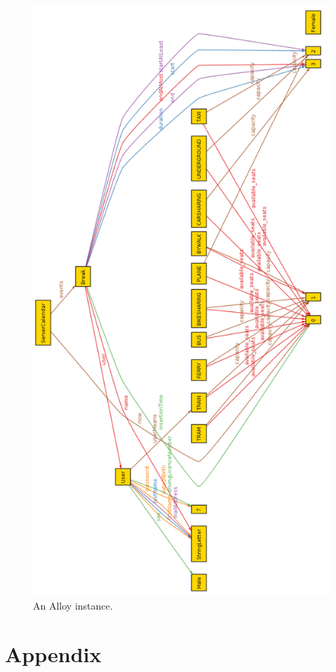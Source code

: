 \documentclass{article}
\begin{document}
	\begin{figure}[h!]
		\bigskip
		\centering
		\includegraphics[scale=0.4]{img/diagrams/i.png}
		\caption{An Alloy instance.}
	\end{figure}
	\newpage
	\appendix
	\section{Appendix}
\end{document}
